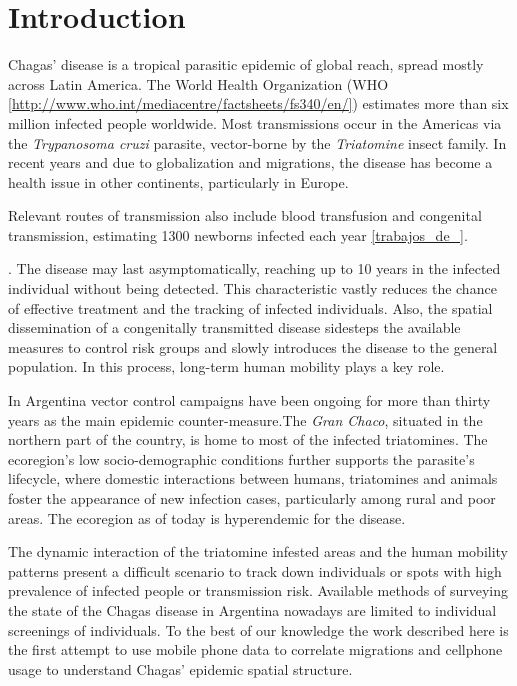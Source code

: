 \section{Introduction}

Chagas' disease is a tropical parasitic epidemic of global reach, spread mostly across Latin America. The World Health Organization (WHO \ref{http://www.who.int/mediacentre/factsheets/fs340/en/}) estimates more than six million infected people worldwide. Most transmissions occur in the Americas via the \textit{Trypanosoma cruzi} parasite, vector-borne by the \textit{Triatomine} insect family. In recent years and due to globalization and migrations, the disease has become a health issue in other continents, particularly in Europe. 

Relevant routes of transmission also include blood transfusion and congenital transmission, estimating 1300 newborns infected each year \ref{trabajos_de_}.\begin{comment}  en el drive estan las ppt del min salud \end{comment}. The disease may last asymptomatically, reaching up to 10 years in the infected individual without being detected. This characteristic vastly reduces the chance of effective treatment and the tracking of infected individuals. Also, the spatial dissemination of a congenitally transmitted disease sidesteps the available measures to control risk groups and slowly introduces the disease to the general population. In this process, long-term human mobility plays a key role.

In Argentina vector control campaigns have been ongoing for more than thirty years as the main epidemic counter-measure.The \textit{Gran Chaco}, situated in the northern part of the country, is home to most of the infected triatomines. The ecoregion's low socio-demographic conditions further supports the parasite's lifecycle, where domestic interactions between humans, triatomines and animals foster the appearance of new infection cases, particularly among rural and poor areas. The ecoregion as of today is hyperendemic for the disease.

The dynamic interaction of the triatomine infested areas and the human mobility patterns present a difficult scenario to track down individuals or spots with high prevalence of infected people or  transmission risk. Available methods of surveying the state of the Chagas disease in Argentina nowadays are limited to individual screenings of individuals. To the best of our knowledge the work described here is the first attempt to use mobile phone data to correlate migrations and cellphone usage to understand Chagas’ epidemic spatial structure.

